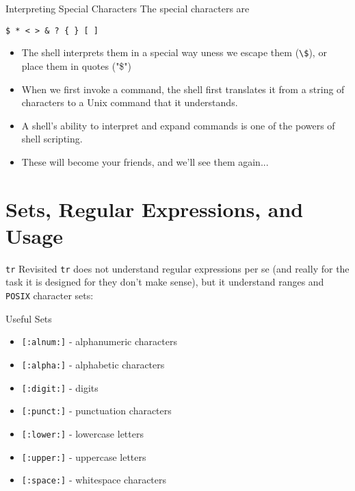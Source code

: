 \begin{frame}[fragile]{Interpreting Special Characters}
  The special characters are
  \begin{center}
    \texttt{\$ * < > \& ? \{ \} [ ]}
  \end{center}
  \begin{itemize}[<+- | alert@+>]
    \item The shell interprets them in a special way uness we escape them (\texttt{\textbackslash\$}), or place
          them in quotes ("\$")
    \item When we first invoke a command, the shell first translates it from a string of characters to a Unix
          command that it understands.
    \item A shell's ability to interpret and expand commands is one of the powers of shell scripting.
    \item These will become your friends, and we'll see them again...
  \end{itemize}
\end{frame}

%

%
\section{Sets, Regular Expressions, and Usage}
\label{sec:sets_regular_expressions_and_usage}

\begin{frame}[fragile]{\texttt{tr} Revisited}
  \texttt{tr} does not understand regular expressions per se (and really for the task it is designed for they
  don't make sense), but it  understand ranges and \texttt{POSIX} character sets:\wl
  \begin{block}{Useful Sets}
    \begin{itemize}
      \item \texttt{[:alnum:]} - alphanumeric characters
      \item \texttt{[:alpha:]} - alphabetic characters
      \item \texttt{[:digit:]} - digits
      \item \texttt{[:punct:]} - punctuation characters
      \item \texttt{[:lower:]} - lowercase letters
      \item \texttt{[:upper:]} - uppercase letters
      \item \texttt{[:space:]} - whitespace characters
    \end{itemize}
  \end{block}
\end{frame}

